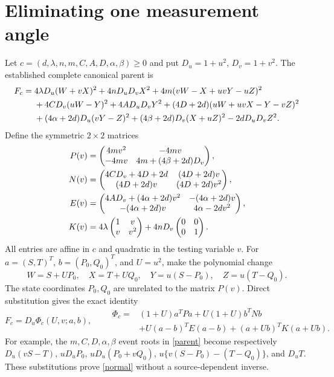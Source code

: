 \documentclass[11pt]{article}
\begin{document}
\section{Eliminating one measurement angle}
Let $c=(d,\lambda,n,m,C,A,D,\alpha,\beta)\geq0$ and put
$D_u=1+u^2$, $D_v=1+v^2$.  The established complete canonical parent is
\begin{align}
F_c={}&4\lambda D_u(W+vX)^2+4nD_uD_vX^2
 +4m(vW-X+uvY-uZ)^2\notag\\
&+4CD_v(uW-Y)^2+4AD_uD_vY^2
 +(4D+2d)(uW+uvX-Y-vZ)^2\notag\\
&+(4\alpha+2d)D_u(vY-Z)^2
 +(4\beta+2d)D_v(X+uZ)^2-2dD_uD_vZ^2.\label{parent}
\end{align}
Define the symmetric
$2\times2$ matrices
\begin{align}
P(v)&=\begin{pmatrix}
4mv^2&-4mv\\-4mv&4m+(4\beta+2d)D_v
\end{pmatrix},\notag\\
N(v)&=\begin{pmatrix}
4CD_v+4D+2d&(4D+2d)v\\(4D+2d)v&(4D+2d)v^2
\end{pmatrix},\label{blocks}\\
E(v)&=\begin{pmatrix}
4AD_v+(4\alpha+2d)v^2&-(4\alpha+2d)v\\
-(4\alpha+2d)v&4\alpha-2dv^2
\end{pmatrix},\notag\\
K(v)&=4\lambda\begin{pmatrix}1&v\\v&v^2\end{pmatrix}
       +4nD_v\begin{pmatrix}0&0\\0&1\end{pmatrix}.\notag
\end{align}
All entries are affine in $c$ and quadratic in the testing variable $v$.
For $a=(S,T)^T$, $b=(P_0,Q_0)^T$, and $U=u^2$, make the polynomial change
\begin{equation}
W=S+UP_0,\quad X=T+UQ_0,\quad
Y=u(S-P_0),\quad Z=u(T-Q_0).\label{change}
\end{equation}
The state coordinates $P_0,Q_0$ are unrelated to the matrix $P(v)$.
Direct substitution gives the exact identity
\begin{equation}
F_c=D_u\Phi_c(U,v;a,b),\qquad
\boxed{\begin{aligned}
\Phi_c={}&(1+U)a^TPa+U(1+U)b^TNb\\
 &+U(a-b)^TE(a-b)+(a+Ub)^TK(a+Ub).
\end{aligned}}\label{normal}
\end{equation}
For example, the $m,C,D,\alpha,\beta$ event roots in \eqref{parent}
become respectively
$D_u(vS-T)$, $uD_uP_0$, $uD_u(P_0+vQ_0)$,
$u\{v(S-P_0)-(T-Q_0)\}$, and $D_uT$.
These substitutions prove \eqref{normal} without a source-dependent inverse.
\end{document}
